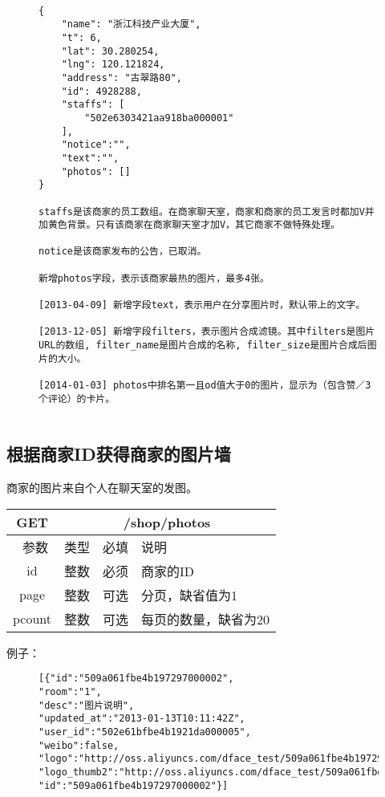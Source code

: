 \documentclass[cs4size]{ctexartutf8}
\begin{document}
\begin{figure}[H]
\begin{verbatim}

{
    "name": "浙江科技产业大厦",
    "t": 6,
    "lat": 30.280254,
    "lng": 120.121824,
    "address": "古翠路80",
    "id": 4928288,
    "staffs": [
        "502e6303421aa918ba000001"
    ],
    "notice":"",
    "text":"",    
    "photos": []
}

staffs是该商家的员工数组。在商家聊天室，商家和商家的员工发言时都加V并加黄色背景。只有该商家在商家聊天室才加V，其它商家不做特殊处理。

notice是该商家发布的公告，已取消。

新增photos字段，表示该商家最热的图片，最多4张。

[2013-04-09] 新增字段text，表示用户在分享图片时，默认带上的文字。

[2013-12-05] 新增字段filters，表示图片合成滤镜。其中filters是图片URL的数组, filter_name是图片合成的名称, filter_size是图片合成后图片的大小。

[2014-01-03] photos中排名第一且od值大于0的图片，显示为（包含赞／3个评论）的卡片。


\end{verbatim}
\end{figure}



\subsection{根据商家ID获得商家的图片墙}
商家的图片来自个人在聊天室的发图。\label{photowall}

\begin{table}[H]
   \begin{center}
\begin{tabular}{|c|c|c|p{12cm}|}
\hline
GET & \multicolumn{3}{|c|}{/shop/photos} \\
\hline\hline
 \  参数  & 类型 & 必填 &  说明  \\
\hline
 id  & 整数 & 必须 & 商家的ID\\
   \hline
 page  & 整数 & 可选 & 分页，缺省值为1\\ 
 \hline
 pcount  & 整数 & 可选 & 每页的数量，缺省为20\\ 
\hline
\end{tabular}
   \end{center}
\end{table}

例子：

\begin{figure}[H]
\begin{verbatim}
[{"id":"509a061fbe4b197297000002",
"room":"1",
"desc":"图片说明",  
"updated_at":"2013-01-13T10:11:42Z",
"user_id":"502e61bfbe4b1921da000005",
"weibo":false,
"logo":"http://oss.aliyuncs.com/dface_test/509a061fbe4b197297000002/0.jpg",
"logo_thumb2":"http://oss.aliyuncs.com/dface_test/509a061fbe4b197297000002/t2_0.jpg",
"id":"509a061fbe4b197297000002"}]

\end{verbatim}
\end{figure}
\end{document}
